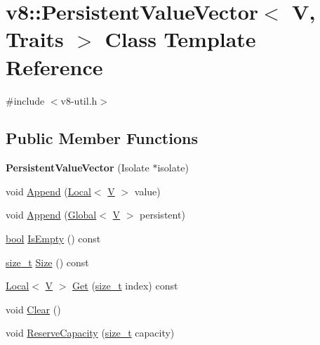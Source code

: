 \hypertarget{classv8_1_1PersistentValueVector}{}\section{v8\+:\+:Persistent\+Value\+Vector$<$ V, Traits $>$ Class Template Reference}
\label{classv8_1_1PersistentValueVector}


{\ttfamily \#include $<$v8-\/util.\+h$>$}

\subsection*{Public Member Functions}
\begin{DoxyCompactItemize}
\item 
\mbox{\label{classv8_1_1PersistentValueVector_ab6b9994133c30359ad7a02d3cc05219c}} 
{\bfseries Persistent\+Value\+Vector} (Isolate $\ast$isolate)
\item 
void \mbox{\hyperlink{classv8_1_1PersistentValueVector_a02376c6d16be29084db46f65473477fb}{Append}} (\mbox{\hyperlink{classv8_1_1Local}{Local}}$<$ \mbox{\hyperlink{classV}{V}} $>$ value)
\item 
void \mbox{\hyperlink{classv8_1_1PersistentValueVector_ad076923fd0046196670e87e996582546}{Append}} (\mbox{\hyperlink{classv8_1_1Global}{Global}}$<$ \mbox{\hyperlink{classV}{V}} $>$ persistent)
\item 
\mbox{\hyperlink{classbool}{bool}} \mbox{\hyperlink{classv8_1_1PersistentValueVector_aa45dd4d1ee94a2c199a28a0bb2e432f1}{Is\+Empty}} () const
\item 
\mbox{\hyperlink{classsize__t}{size\+\_\+t}} \mbox{\hyperlink{classv8_1_1PersistentValueVector_adf4e13701de97acc753ca294c66b9f35}{Size}} () const
\item 
\mbox{\hyperlink{classv8_1_1Local}{Local}}$<$ \mbox{\hyperlink{classV}{V}} $>$ \mbox{\hyperlink{classv8_1_1PersistentValueVector_a0788f334c7f61355863244379042ce76}{Get}} (\mbox{\hyperlink{classsize__t}{size\+\_\+t}} index) const
\item 
void \mbox{\hyperlink{classv8_1_1PersistentValueVector_ad07f449c2004b4f3d91e58cabde99a53}{Clear}} ()
\item 
void \mbox{\hyperlink{classv8_1_1PersistentValueVector_ad4cccfee3a275986578276efe0c78510}{Reserve\+Capacity}} (\mbox{\hyperlink{classsize__t}{size\+\_\+t}} capacity)
\end{DoxyCompactItemize}


